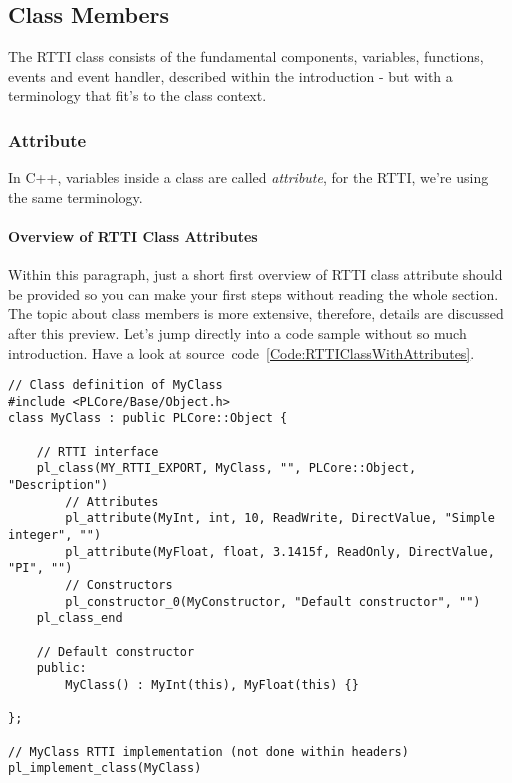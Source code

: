 \subsection{Class Members}
The \ac{RTTI} class consists of the fundamental components, variables, functions, events and event handler, described within the introduction - but with a terminology that fit's to the class context.



\subsubsection{Attribute}
In C++, variables inside a class are called \emph{attribute}, for the \ac{RTTI}, we're using the same terminology.


\paragraph{Overview of \ac{RTTI} Class Attributes}
Within this paragraph, just a short first overview of \ac{RTTI} class attribute should be provided so you can make your first steps without reading the whole section. The topic about class members is more extensive, therefore, details are discussed after this preview. Let's jump directly into a code sample without so much introduction. Have a look at source~code~\ref{Code:RTTIClassWithAttributes}.
\begin{lstlisting}[float=htb,label=Code:RTTIClassWithAttributes,caption={Defining a new \ac{RTTI} class with attributes}]
// Class definition of MyClass
#include <PLCore/Base/Object.h>
class MyClass : public PLCore::Object {

	// RTTI interface
	pl_class(MY_RTTI_EXPORT, MyClass, "", PLCore::Object, "Description")
		// Attributes
		pl_attribute(MyInt, int, 10, ReadWrite, DirectValue, "Simple integer", "")
		pl_attribute(MyFloat, float, 3.1415f, ReadOnly, DirectValue, "PI", "")
		// Constructors
		pl_constructor_0(MyConstructor, "Default constructor", "")
	pl_class_end

	// Default constructor
	public:
		MyClass() : MyInt(this), MyFloat(this) {}

};

// MyClass RTTI implementation (not done within headers)
pl_implement_class(MyClass)
\end{lstlisting}
